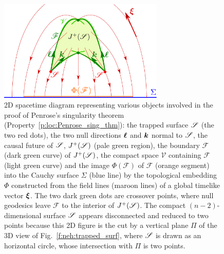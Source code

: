 \begin{figure}
\centerline{\includegraphics[width=0.7\textwidth]{loc_penrose_thm.pdf}}
\caption[]{\label{f:loc:penrose_thm} \footnotesize
2D spacetime diagram representing various objects involved in the
proof of Penrose's singularity theorem (Property~\ref{p:loc:Penrose_sing_thm}):
the trapped surface $\mathscr{S}$ (the two red dots),
the two null directions $\bm{\ell}$ and $\bm{k}$ normal to $\mathscr{S}$,
the causal future of $\mathscr{S}$, $J^+(\mathscr{S})$ (pale green region),
the boundary $\mathscr{F}$ (dark green curve)
of $J^+(\mathscr{S})$, the compact space $\mathscr{V}$ containing $\mathscr{F}$ (light green curve)
and the image $\Phi(\mathscr{F})$ of $\mathscr{F}$ (orange segment) into
the Cauchy surface $\Sigma$ (blue line) by the topological embedding $\Phi$
constructed from the field lines (maroon lines) of a global timelike vector
$\bm{\xi}$. The two dark green dots are crossover points, where null
geodesics leave $\mathscr{F}$ to the interior of $J^+(\mathscr{S})$.
The compact $(n-2)$-dimensional surface $\mathscr{S}$ appears disconnected and reduced
to two points because this 2D figure is the cut by a vertical plane $\Pi$
of the 3D view of Fig.~\ref{f:neh:trapped_surf}, where $\mathscr{S}$ is drawn as
an horizontal circle, whose intersection with $\Pi$ is two points.
}
\end{figure}



